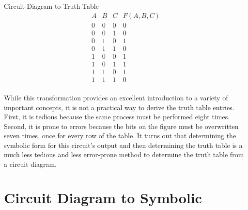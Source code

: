\begin{process}{Circuit Diagram to Truth Table}
$$\begin{array}{c|c|c||c}
A & B & C & F(A,B,C) \\ \hline \hline
0 & 0 & 0 & 0  \\ \hline
0 & 0 & 1 & 0  \\ \hline
0 & 1 & 0 & 1  \\ \hline
0 & 1 & 1 & 0  \\ \hline
1 & 0 & 0 & 1  \\ \hline
1 & 0 & 1 & 1  \\ \hline
1 & 1 & 0 & 1  \\ \hline
1 & 1 & 1 & 0  \\
\end{array}$$
\end{process}

While this transformation provides an excellent introduction to a variety
of important concepts, it is not a practical way to derive the truth table 
entries.  First, it is tedious because the same process must be performed 
eight times.  Second, it is prone to errors because the bits on the figure
must be overwritten seven times, once for every row of the table. 
It turns out that determining the symbolic
form for this circuit's output and then determining the truth table is a
much less tedious and less error-prone method to determine the truth table
from a circuit diagram.

\section{Circuit Diagram to Symbolic}

